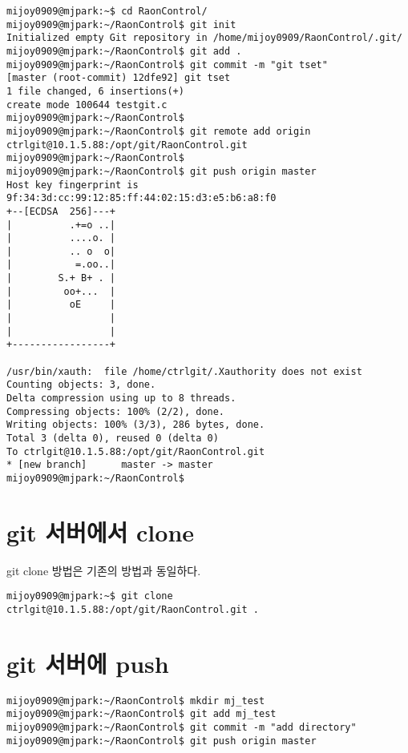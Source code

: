\documentclass[11pt
  , a4paper
  , article
  , oneside
]{memoir}
\begin{document}
\scriptsize
{
\begin{verbatim}
mijoy0909@mjpark:~$ cd RaonControl/
mijoy0909@mjpark:~/RaonControl$ git init
Initialized empty Git repository in /home/mijoy0909/RaonControl/.git/
mijoy0909@mjpark:~/RaonControl$ git add .
mijoy0909@mjpark:~/RaonControl$ git commit -m "git tset"
[master (root-commit) 12dfe92] git tset
1 file changed, 6 insertions(+)
create mode 100644 testgit.c
mijoy0909@mjpark:~/RaonControl$ 
mijoy0909@mjpark:~/RaonControl$ git remote add origin ctrlgit@10.1.5.88:/opt/git/RaonControl.git
mijoy0909@mjpark:~/RaonControl$ 
mijoy0909@mjpark:~/RaonControl$ git push origin master
Host key fingerprint is 9f:34:3d:cc:99:12:85:ff:44:02:15:d3:e5:b6:a8:f0
+--[ECDSA  256]---+
|          .+=o ..|
|          ....o. |
|          .. o  o|
|           =.oo..|
|        S.+ B+ . |
|         oo+...  |
|          oE     |
|                 |
|                 |
+-----------------+

/usr/bin/xauth:  file /home/ctrlgit/.Xauthority does not exist
Counting objects: 3, done.
Delta compression using up to 8 threads.
Compressing objects: 100% (2/2), done.
Writing objects: 100% (3/3), 286 bytes, done.
Total 3 (delta 0), reused 0 (delta 0)
To ctrlgit@10.1.5.88:/opt/git/RaonControl.git
* [new branch]      master -> master
mijoy0909@mjpark:~/RaonControl$ 
\end{verbatim}
}

\section{git 서버에서 clone}
git clone 방법은 기존의 방법과 동일하다.

\scriptsize
{
\begin{verbatim}
mijoy0909@mjpark:~$ git clone ctrlgit@10.1.5.88:/opt/git/RaonControl.git .
\end{verbatim}
}

\scriptsize
{
\section{git 서버에 push}
\begin{verbatim}
mijoy0909@mjpark:~/RaonControl$ mkdir mj_test
mijoy0909@mjpark:~/RaonControl$ git add mj_test
mijoy0909@mjpark:~/RaonControl$ git commit -m "add directory"
mijoy0909@mjpark:~/RaonControl$ git push origin master
\end{verbatim}
}
\clearpage
\end{document}
